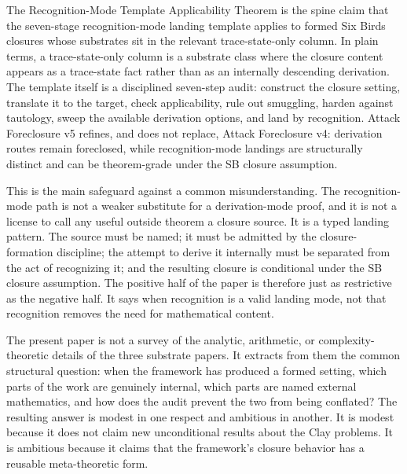 \documentclass[11pt]{article}
\theoremstyle{definition}
\begin{document}
The Recognition-Mode Template Applicability Theorem is the spine
claim that the seven-stage recognition-mode landing template applies
to formed Six Birds closures whose substrates sit in the relevant
trace-state-only column.  In plain terms, a trace-state-only column is
a substrate class where the closure content appears as a trace-state
fact rather than as an internally descending derivation.  The template
itself is a disciplined seven-step audit: construct the closure
setting, translate it to the target, check applicability, rule out
smuggling, harden against tautology, sweep the available derivation
options, and land by recognition.  Attack Foreclosure v5 refines, and
does not replace, Attack Foreclosure v4: derivation routes remain
foreclosed, while recognition-mode landings are structurally distinct
and can be theorem-grade under the SB closure assumption.

This is the main safeguard against a common misunderstanding.  The
recognition-mode path is not a weaker substitute for a derivation-mode
proof, and it is not a license to call any useful outside theorem a
closure source.  It is a typed landing pattern.  The source must be
named; it must be admitted by the closure-formation discipline; the
attempt to derive it internally must be separated from the act of
recognizing it; and the resulting closure is conditional under the SB
closure assumption.  The positive half of the paper is therefore just
as restrictive as the negative half.  It says when recognition is a
valid landing mode, not that recognition removes the need for
mathematical content.

The present paper is not a survey of the analytic, arithmetic, or
complexity-theoretic details of the three substrate papers.  It
extracts from them the common structural question: when the framework
has produced a formed setting, which parts of the work are genuinely
internal, which parts are named external mathematics, and how does the
audit prevent the two from being conflated?  The resulting answer is
modest in one respect and ambitious in another.  It is modest because
it does not claim new unconditional results about the Clay problems.
It is ambitious because it claims that the framework's closure
behavior has a reusable meta-theoretic form.
\end{document}
